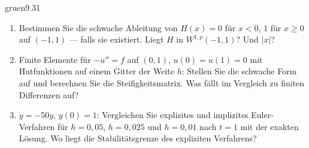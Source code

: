 \begin{karte}{gruen}{9.31}{\typwerk}{}
\begin{enumerate}[label=(\alph*),leftmargin=1.6em,itemsep=2pt]
\item Bestimmen Sie die schwache Ableitung von $H(x) = 0$ für $x < 0$, $1$ für $x\ge0$ auf $(-1, 1)$ --- falls sie existiert. Liegt $H$ in $W^{1,p}(-1, 1)$? Und $|x|$?
\item Finite Elemente für $-u'' = f$ auf $(0, 1)$, $u(0) = u(1) = 0$ mit Hutfunktionen auf einem Gitter der Weite $h$: Stellen Sie die schwache Form auf und berechnen Sie die Steifigkeitsmatrix. Was fällt im Vergleich zu finiten Differenzen auf?
\item $\dot y = -50y$, $y(0) = 1$: Vergleichen Sie explizites und implizites Euler-Verfahren für $h = 0{,}05$, $h = 0{,}025$ und $h = 0{,}01$ nach $t = 1$ mit der exakten Lösung. Wo liegt die Stabilitätsgrenze des expliziten Verfahrens?
\end{enumerate}
\end{karte}

